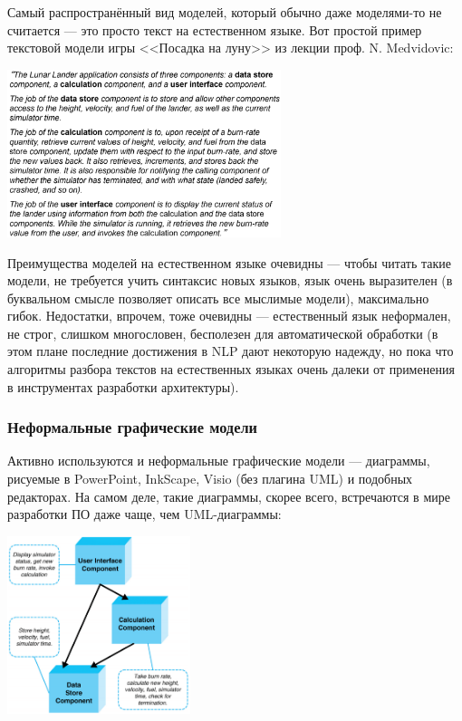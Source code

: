 \documentclass{../../text-style}
\begin{document}
Самый распространённый вид моделей, который обычно даже моделями-то не считается --- это просто текст на естественном языке. Вот простой пример текстовой модели игры <<Посадка на луну>> из лекции проф. N. Medvidovic:

\begin{center}
    \includegraphics[width=0.6\textwidth]{naturalLanguage.png}
\end{center}

Преимущества моделей на естественном языке очевидны --- чтобы читать такие модели, не требуется учить синтаксис новых языков, язык очень выразителен (в буквальном смысле позволяет описать все мыслимые модели), максимально гибок. Недостатки, впрочем, тоже очевидны --- естественный язык неформален, не строг, слишком многословен, бесполезен для автоматической обработки (в этом плане последние достижения в NLP дают некоторую надежду, но пока что алгоритмы разбора текстов на естественных языках очень далеки от применения в инструментах разработки архитектуры).

\subsubsection{Неформальные графические модели}

Активно используются и неформальные графические модели --- диаграммы, рисуемые в PowerPoint, InkScape, Visio (без плагина UML) и подобных редакторах. На самом деле, такие диаграммы, скорее всего, встречаются в мире разработки ПО даже чаще, чем UML-диаграммы:

\begin{center}
    \includegraphics[width=0.4\textwidth]{informalModel.png}
\end{center}
\end{document}

